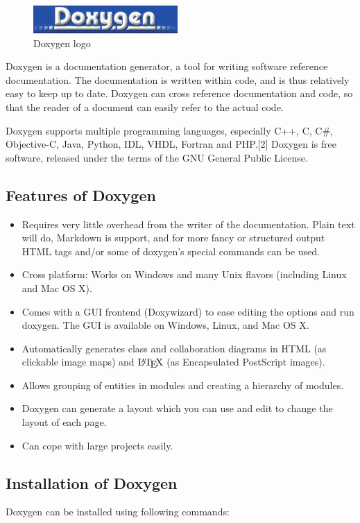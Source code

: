 \begin{figure}[h]
\centering \includegraphics[scale=1]{images/doxygen.jpg}
\caption{Doxygen logo}
\end{figure}
\noindent Doxygen is a documentation generator, a tool for writing software reference 
documentation. The documentation is written within code, and is thus 
relatively easy to keep up to date. Doxygen can cross reference 
documentation and code, so that the reader of a document can easily 
refer to the actual code.

Doxygen supports multiple programming languages, especially C++, C, 
C\#, Objective-C, Java, Python, IDL, VHDL, Fortran and PHP.[2] Doxygen
 is free software, released under the terms of the GNU General Public 
License.\\

\subsection{Features of Doxygen}
\begin{itemize}
\item Requires very little overhead from the writer of the documentation. 
Plain text will do, Markdown is support, and for more fancy or structured 
output HTML tags and/or some of doxygen's special commands can be used.
\item Cross platform: Works on Windows and many Unix flavors (including 
Linux and Mac OS X).
\item Comes with a GUI frontend (Doxywizard) to ease editing the options 
and run doxygen. The GUI is available on Windows, Linux, and Mac OS X.
\item Automatically generates class and collaboration diagrams in HTML 
(as clickable image maps) and $\mbox{\LaTeX}$ (as Encapsulated PostScript 
images).
\item Allows grouping of entities in modules and creating a hierarchy 
of modules.
\item Doxygen can generate a layout which you can use and edit to change 
the layout of each page.
\item Can cope with large projects easily.
\end{itemize}
\subsection{Installation of Doxygen}
Doxygen can be installed using following commands:\\

